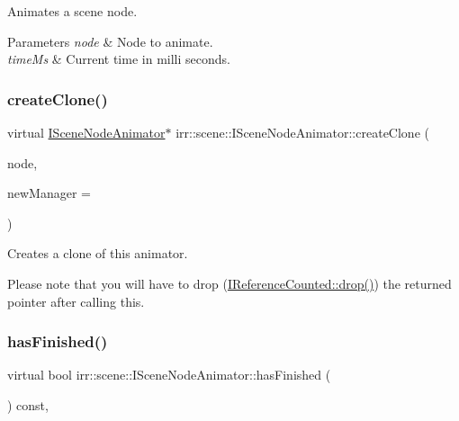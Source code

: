 Animates a scene node. 


\begin{DoxyParams}{Parameters}
{\em node} & Node to animate. \\
\hline
{\em time\+Ms} & Current time in milli seconds. \\
\hline
\end{DoxyParams}
\mbox{\label{classirr_1_1scene_1_1ISceneNodeAnimator_a9cc261c12459fc7d3da6c2595d721c0d}} 
\subsubsection{\texorpdfstring{create\+Clone()}{createClone()}}
{\footnotesize\ttfamily virtual \hyperlink{classirr_1_1scene_1_1ISceneNodeAnimator}{I\+Scene\+Node\+Animator}$\ast$ irr\+::scene\+::\+I\+Scene\+Node\+Animator\+::create\+Clone (\begin{DoxyParamCaption}\item[{\hyperlink{classirr_1_1scene_1_1ISceneNode}{I\+Scene\+Node} $\ast$}]{node,  }\item[{\hyperlink{classirr_1_1scene_1_1ISceneManager}{I\+Scene\+Manager} $\ast$}]{new\+Manager = {} }\end{DoxyParamCaption})\hspace{0.3cm}{\ttfamily [pure virtual]}}



Creates a clone of this animator. 

Please note that you will have to drop (\hyperlink{classirr_1_1IReferenceCounted_a03856a09355b89d178090c4a5f738543}{I\+Reference\+Counted\+::drop()}) the returned pointer after calling this. \mbox{\label{classirr_1_1scene_1_1ISceneNodeAnimator_a77fd626155079b11327f0bd775e85425}} 
\subsubsection{\texorpdfstring{has\+Finished()}{hasFinished()}}
{\footnotesize\ttfamily virtual bool irr\+::scene\+::\+I\+Scene\+Node\+Animator\+::has\+Finished (\begin{DoxyParamCaption}\item[{void}]{ }\end{DoxyParamCaption}) const\hspace{0.3cm}{\ttfamily [inline]}, {\ttfamily [virtual]}}



